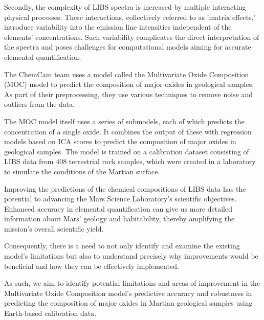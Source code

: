Secondly, the complexity of LIBS spectra is increased by multiple interacting physical processes.
These interactions, collectively referred to as 'matrix effects,' introduce variability into the emission line intensities independent of the elements' concentrations.
Such variability complicates the direct interpretation of the spectra and poses challenges for computational models aiming for accurate elemental quantification.\cite{andersonImprovedAccuracyQuantitative2017}

The ChemCam team uses a model called the Multivariate Oxide Composition (MOC) model to predict the composition of major oxides in geological samples. As part of their preprocessing, they use various techniques to remove noise and outliers from the data.\cite{cleggRecalibrationMarsScience2017}

The MOC model itself uses a series of submodels, each of which predicts the concentration of a single oxide. It combines the output of these with regression models based on ICA scores to predict the composition of major oxides in geological samples.
The model is trained on a calibration dataset consisting of LIBS data from 408 terrestrial rock samples, which were created in a laboratory to simulate the conditions of the Martian surface.\cite{cleggRecalibrationMarsScience2017}

Improving the predictions of the chemical compositions of LIBS data has the potential to advancing the Mars Science Laboratory's scientific objectives.
Enhanced accuracy in elemental quantification can give us more detailed information about Mars' geology and habitability, thereby amplifying the mission's overall scientific yield. 

Consequently, there is a need to not only identify and examine the existing model's limitations but also to understand precisely why improvements would be beneficial and how they can be effectively implemented.

As such, we aim to identify potential limitations and areas of improvement in the Multivariate Oxide Composition model's predictive accuracy and robustness in predicting the composition of major oxides in Martian geological samples using Earth-based calibration data.

